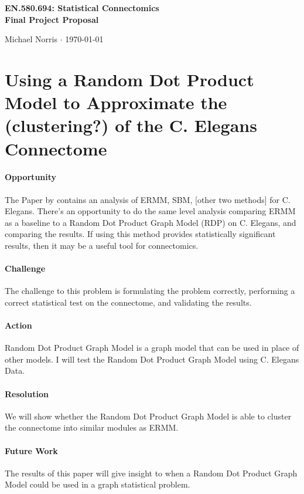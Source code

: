\documentclass[12pt]{article}
\begin{document}

\begin{center}\Large \bf EN.580.694: Statistical Connectomics \\ Final Project Proposal \end{center}
\begin{center} Michael Norris $\cdot$ \today \end{center}
\bigskip
\section*{Using a Random Dot Product Model to Approximate the (clustering?) of 
the C. Elegans Connectome}
\paragraph{Opportunity}
The Paper by \cite{2014PLoSO...997584P} contains an analysis of ERMM, SBM, [other two methods] for C. Elegans.  There's an opportunity to do the same level analysis comparing
ERMM as a baseline to a Random Dot Product Graph Model (RDP) on C. Elegans, and 
comparing the results.  If using this method provides statistically significant results, then it may be a useful tool for connectomics.
\paragraph{Challenge}
The challenge to this problem is formulating the problem correctly,
performing a correct statistical test on the connectome, and validating the
results.

\paragraph{Action}
Random Dot Product Graph Model is a graph model that can be used in place of 
other models.  I will test the Random Dot Product Graph Model using C. Elegans 
Data.
\paragraph{Resolution}
We will show whether the Random Dot Product Graph Model is able to cluster the 
connectome into similar modules as ERMM.
\paragraph{Future Work}
The results of this paper will give insight to when a Random Dot Product Graph 
Model could be used in a graph statistical problem.
\pagebreak
\end{document}
